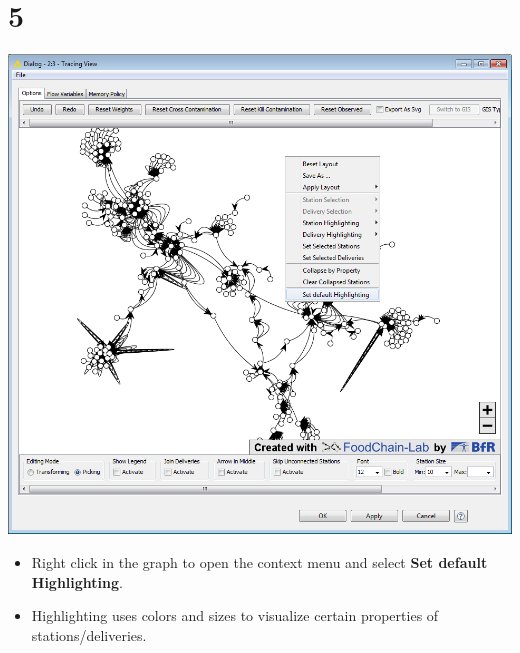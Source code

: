 \documentclass{beamer}
\begin{document}
\section{5}
\begin{frame}
	\begin{center}
  		\includegraphics[height=0.6\textheight]{5.png}
	\end{center}
	\begin{itemize}
		\item Right click in the graph to open the context menu and select \textbf{Set default Highlighting}.
		\item Highlighting uses colors and sizes to visualize certain properties of stations/deliveries.
	\end{itemize}
\end{frame}
\end{document}
